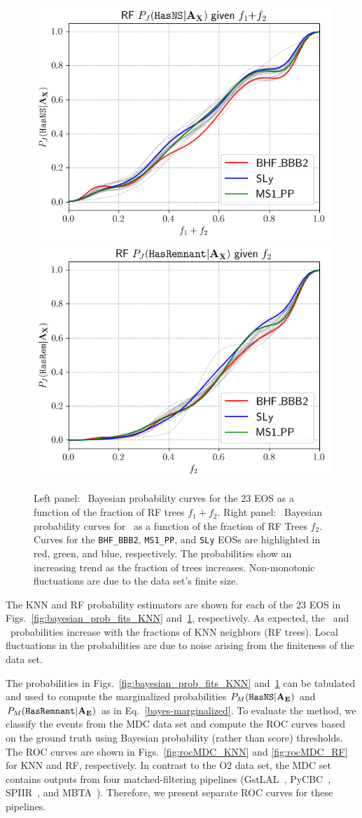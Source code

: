 \begin{figure}%
\includegraphics[width=0.45\linewidth]{RF_3_eos_prob_plots_HasNS}
\includegraphics[width=0.45\linewidth]{RF_3_eos_prob_plots_HasRem}
\caption{Left panel: \hasns\ Bayesian probability curves for the 23 \ac{EOS} as a function of the fraction of \ac{RF} trees $f_1+f_2$. Right panel: \hasrem\ Bayesian probability curves for \hasrem\ as a function of the fraction of \ac{RF} Trees $f_2$. Curves for the {\tt BHF\_BBB2}, {\tt MS1\_PP}, and {\tt SLy} \ac{EOS}s are highlighted in red, green, and blue, respectively. The probabilities show an increasing trend as the fraction of trees increases.  Non-monotonic fluctuations are due to the data set's finite size.}
\label{fig:bayesian_prob_fits_RF}
\end{figure}

The \ac{KNN} and \ac{RF} probability estimators are shown for each of the 23 \ac{EOS} in Figs.~\ref{fig:bayesian_prob_fits_KNN} and~\ref{fig:bayesian_prob_fits_RF}, respectively. As
expected, the \hasns\ and \hasrem\ probabilities increase with the fractions of \ac{KNN} neighbors (\ac{RF} trees). Local fluctuations in the probabilities are due to noise arising from
the finiteness of the data set. 

The probabilities in Figs.~\ref{fig:bayesian_prob_fits_KNN} and~\ref{fig:bayesian_prob_fits_RF} can be tabulated and used to compute the marginalized probabilities $P_M({{\tt HasNS}}|{\bf
A}_{\bf E})$ and $P_M({{\tt HasRemnant}}|{\bf A}_{\bf E})$ as in Eq.~\eqref{bayes-marginalized}. To evaluate the method, we classify the events from the \ac{MDC} data set and compute the \ac{ROC}
curves based on the ground truth using Bayesian probability (rather than score) thresholds. The \ac{ROC} curves are shown in Figs.~\ref{fig:rocMDC_KNN} and \ref{fig:rocMDC_RF} for
\ac{KNN} and \ac{RF}, respectively. In contrast to the \ac{O2} data set, the \ac{MDC} set contains outputs from four matched-filtering pipelines
(GstLAL~\cite{Sachdev:2019vvd,PhysRevD.95.042001,Sachdev:2020lfd},  PyCBC~\cite{Nitz:2018rgo,DalCanton:2020vpm}, SPIIR~\cite{Chu:2020pjv}, and MBTA~\cite{Adams:2015ulm}). Therefore, we
present separate \ac{ROC} curves for these pipelines. 

